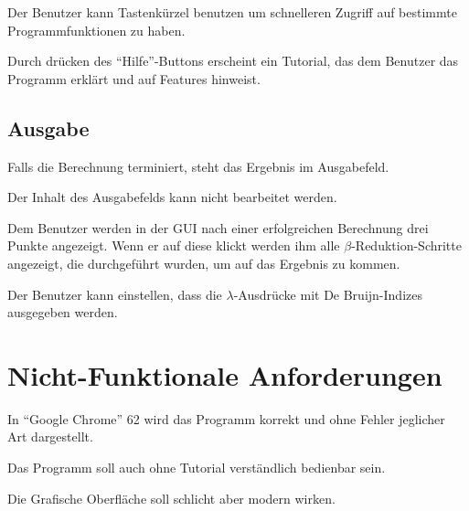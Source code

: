 \documentclass[parskip=full,11pt,twoside]{scrartcl}
\begin{document}
Der Benutzer kann Tastenkürzel benutzen um schnelleren Zugriff auf bestimmte Programmfunktionen zu haben.

Durch drücken des \enquote {Hilfe}-Buttons erscheint ein Tutorial, das dem Benutzer das Programm erklärt und auf Features hinweist.



\subsection{Ausgabe}

Falls die Berechnung terminiert, steht das Ergebnis im Ausgabefeld.

Der Inhalt des Ausgabefelds kann nicht bearbeitet werden.

Dem Benutzer werden in der GUI nach einer erfolgreichen Berechnung drei Punkte angezeigt. Wenn er auf diese klickt werden ihm alle $\beta$-Reduktion-Schritte angezeigt, die durchgeführt wurden, um auf das Ergebnis zu kommen.

Der Benutzer kann einstellen, dass die $\lambda$-Ausdrücke mit De Bruijn-Indizes ausgegeben werden.














\newpage
\section{Nicht-Funktionale Anforderungen}


In \enquote{Google Chrome} 62 wird das Programm korrekt und ohne Fehler jeglicher Art dargestellt.

Das Programm soll auch ohne Tutorial verständlich bedienbar sein.

Die Grafische Oberfläche soll schlicht aber modern wirken.
\end{document}
